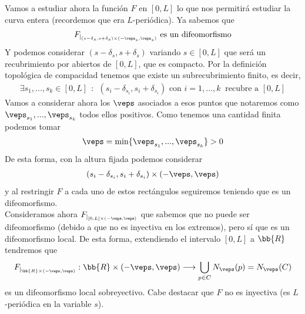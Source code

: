 Vamos a estudiar ahora la función $F$ en $[0,L]$ lo que nos permitirá estudiar la curva entera (recordemos que era $L$-periódica). Ya sabemos que 
\begin{gather*}
    F_{|_{(s-\delta_s, s+\delta_s) \times (-\veps_s, \veps_s)}} \text{ es un difeomorfismo}
\end{gather*}
Y podemos considerar $(s-\delta_s, s+\delta_s)$ variando $s\in [0,L]$ que será un recubrimiento por abiertos de $[0,L]$, que es compacto. Por la definición topológica de compacidad tenemos que existe un subrecubrimiento finito, es decir,
\begin{gather*}
    \exists s_1,...,s_k\in [0,L] \ \ : \ \ (s_i - \delta_{s_i}, s_i + \delta_{s_i}) \text{ con } i=1,...,k \ \text{ recubre a } [0,L]
\end{gather*}
Vamos a considerar ahora los $\veps$ asociados a esos puntos que notaremos como $\veps_{s_1}, ..., \veps_{s_k}$ todos ellos positivos. Como tenemos una cantidad finita podemos tomar
\begin{gather*}
    \veps = \min\{\veps_{s_1}, ..., \veps_{s_k}\} > 0
\end{gather*}
De esta forma, con la altura fijada podemos considerar
\begin{gather*}
    (s_i - \delta_{s_i}, s_i + \delta_{s_i})\times(-\veps, \veps)
\end{gather*}
y al restringir $F$ a cada uno de estos rectángulos seguiremos teniendo que es un difeomorfismo.\\

Consideramos ahora $F_{|_{[0,L]\times(-\veps, \veps)}}$ que sabemos que no puede ser difeomorfismo (debido a que no es inyectiva en los extremos), pero sí que es un difeomorfismo local.
De esta forma, extendiendo el intervalo $[0,L]$ a $\bb{R}$ tendremos que
\begin{gather*}
    F_{|_{\bb{R}\times(-\veps, \veps)}} : \bb{R}\times(-\veps, \veps) \longrightarrow \bigcup_{p\in C} N_\veps(p) = N_\veps(C)
\end{gather*}
es un difeomorfismo local sobreyectivo. Cabe destacar que $F$ no es inyectiva (es $L$-periódica en la variable $s$).

